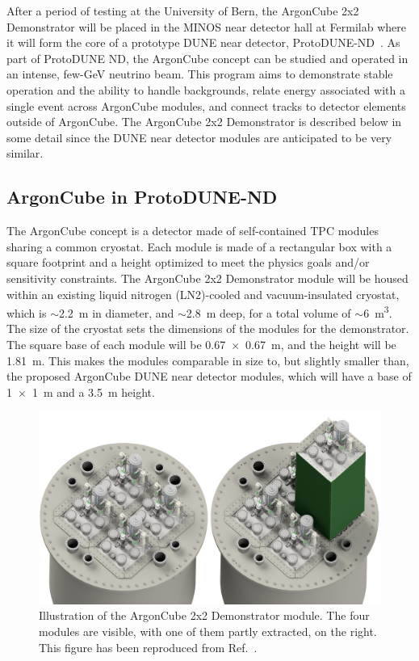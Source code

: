 After a period of testing at the University of Bern, the ArgonCube 2x2 Demonstrator will be placed in the MINOS near detector hall at Fermilab where it will form the core of a prototype DUNE near detector, ProtoDUNE-ND~\cite{protoND}.   As part of ProtoDUNE ND, the ArgonCube concept can be studied and operated in an intense, few-GeV neutrino beam.  This program aims to demonstrate stable operation and the ability to handle backgrounds, relate energy associated with a single event across ArgonCube modules, and connect tracks to detector elements outside of ArgonCube.  The ArgonCube 2x2 Demonstrator is described below in some detail since the DUNE near detector modules are anticipated to be very similar.


\subsection{ArgonCube in ProtoDUNE-ND}
\label{sec:2x2-design}


The  ArgonCube concept is a detector made of self-contained TPC modules sharing a common cryostat. Each module is made of a rectangular box with a square footprint and a height optimized to meet the physics goals and/or sensitivity constraints. The ArgonCube 2x2 Demonstrator module will be housed within an existing liquid nitrogen (LN2)-cooled and vacuum-insulated cryostat, 
which is $\sim$\SI{2.2}{\metre} in diameter, and $\sim$\SI{2.8}{\metre} deep, for a total volume of $\sim$\SI{6}{\metre\cubed}. The size of the cryostat sets the dimensions of the modules for the demonstrator. The square base of each module will be \SI{0.67 x 0.67}{\metre}, and the height will be \SI{1.81}{\metre}. This makes the modules comparable in size to, but slightly smaller than, the proposed ArgonCube DUNE near detector modules, which will have a base of \SI{1 x 1}{\metre} and a \SI{3.5}{\metre} height.

\begin{figure}[htbp]
	\centering
	\includegraphics[width=\textwidth]{graphics/BathAndModule.jpeg}
	\caption{Illustration of the ArgonCube 2x2 Demonstrator module. The four modules are visible, with one of them partly extracted, on the right. This figure has been reproduced from Ref.~\cite{argoncube_loi}.}
	\label{fig:2x2_extraction}
\end{figure}

